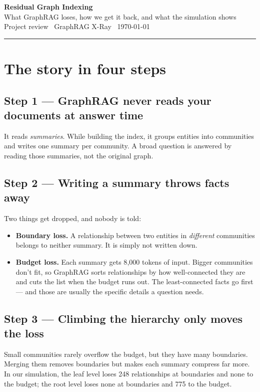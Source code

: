 \documentclass[11pt]{article}
\begin{document}
\thispagestyle{empty}

{\LARGE\bfseries Residual Graph Indexing}\\[2pt]
{\large\color{ink2} What GraphRAG loses, how we get it back, and what the simulation shows}\\[6pt]
{\color{ink2}\small Project review \textbullet\ GraphRAG X-Ray \textbullet\ \today}

\vspace{4pt}
\hrule
\vspace{2pt}

\section{The story in four steps}

\subsection{Step 1 --- GraphRAG never reads your documents at answer time}
It reads \emph{summaries}. While building the index, it groups entities into communities and writes one summary per community. A broad question is answered by reading those summaries, not the original graph.

\subsection{Step 2 --- Writing a summary throws facts away}
Two things get dropped, and nobody is told:
\begin{itemize}
  \item \textbf{Boundary loss.} A relationship between two entities in \emph{different} communities belongs to neither summary. It is simply not written down.
  \item \textbf{Budget loss.} Each summary gets 8{,}000 tokens of input. Bigger communities don't fit, so GraphRAG sorts relationships by how well-connected they are and cuts the list when the budget runs out. The least-connected facts go first --- and those are usually the specific details a question needs.
\end{itemize}

\subsection{Step 3 --- Climbing the hierarchy only moves the loss}
Small communities rarely overflow the budget, but they have many boundaries. Merging them removes boundaries but makes each summary compress far more. In our simulation, the leaf level loses 248 relationships at boundaries and none to the budget; the root level loses none at boundaries and 775 to the budget.
\end{document}
